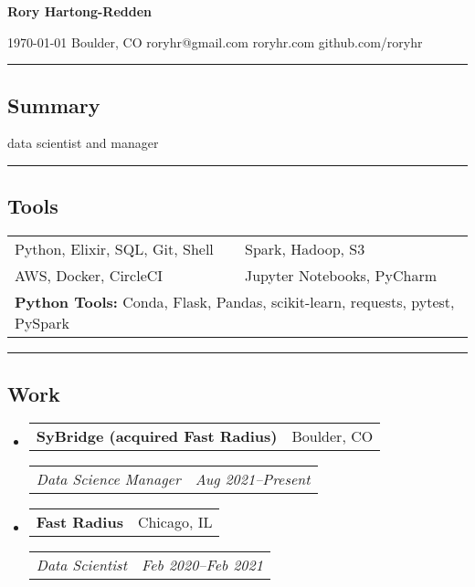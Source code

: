 \documentclass[10pt,letterpaper]{article}
\makeatletter
\newenvironment{indentsection}[1]
{\begin{list}{}%
	{\setlength{\leftmargin}{#1}}
	\item[]%
}
{\end{list}}
\newcommand{\headerrow}[2]{
\begin{tabular*}{\linewidth}{l@{\extracolsep{\fill}}r}
		#1 &
		#2 \\
	\end{tabular*}
}
\newcommand{\jobitem}[4]{\item \headerrow{\textbf{#1}}{#2}
\headerrow{\emph{#3}}{\emph{#4}}}
\makeatother
\begin{document}
{\raggedright \LARGE \bf Rory Hartong-Redden\\}

{\raggedleft 
\today \/ \textbar
\/ Boulder, CO \textbar
\/ roryhr@gmail.com \textbar
\/ roryhr.com \textbar\/   
github.com/roryhr\\
}
\hrule

\subsection*{Summary}
\begin{centering}  
data scientist and manager\\
\end{centering}

\hrule
\subsection*{Tools}
\begin{indentsection}{\parindent}
\begin{tabular}{p{0.5\linewidth}   p{0.5\linewidth}} 
	Python, Elixir, SQL, Git, Shell
	& Spark, Hadoop, S3 \\

	AWS, Docker, CircleCI 
	& Jupyter Notebooks, PyCharm\\ 
	
	\multicolumn{2}{l}{
		\textbf{Python Tools:} Conda, Flask, Pandas, scikit-learn, requests, pytest, PySpark
		}
\end{tabular}
\end{indentsection}

\hrule
\subsection*{Work}

\begin{itemize}
	\jobitem{SyBridge (acquired Fast Radius)}{Boulder, CO}
		     {Data Science Manager}{Aug 2021--Present}
\end{itemize}

\begin{itemize}
	\jobitem{Fast Radius}{Chicago, IL}
		     {Data Scientist}{Feb 2020--Feb 2021}
\end{itemize}
\end{document}
